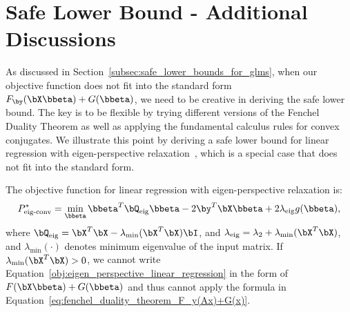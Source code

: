 \section{Safe Lower Bound - Additional Discussions}
\label{appendix_sec:safe_lower_bound_more_discussions}

As discussed in Section~\ref{subsec:safe_lower_bounds_for_glms}, when our objective function does not fit into the standard form $F_{\by}(\bX \bbeta) + G(\bbeta)$, we need to be creative in deriving the safe lower bound.
The key is to be flexible by trying different versions of the Fenchel Duality Theorem as well as applying the fundamental calculus rules for convex conjugates.
We illustrate this point by deriving a safe lower bound for linear regression with eigen-perspective relaxation~\cite{liu2024okridge}, which is a special case that does not fit into the standard form.

The objective function for linear regression with eigen-perspective relaxation is:
\begin{align}
    \label{obj:eigen_perspective_linear_regression}
    P^*_{\text{eig-conv}} = \min_{\bbeta} \bbeta^T \bQ_{\text{eig}} \bbeta - 2\by^T \bX \bbeta +  2 \lambda_{\text{eig}} g(\bbeta),
\end{align}
where $\bQ_{\text{eig}} = \bX^T \bX - \lambda_{\text{min}}(\bX^T \bX) \bI$, and $\lambda_{\text{eig}} = \lambda_2 + \lambda_{\text{min}}(\bX^T \bX)$, and $\lambda_{\text{min}}(\cdot)$ denotes minimum eigenvalue of the input matrix.
If $\lambda_{\text{min}}(\bX^T \bX) > 0$, we cannot write Equation~\eqref{obj:eigen_perspective_linear_regression} in the form of $F(\bX \bbeta) + G(\bbeta)$ and thus cannot apply the formula in Equation~\eqref{eq:fenchel_duality_theorem_F_y(Ax)+G(x)}.

